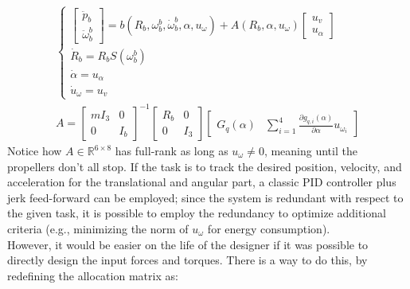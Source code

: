 \begin{gather*}
    \begin{cases}
        \begin{bmatrix}
            \ddot{p}_b \\ \ddot{\omega}_b^b
        \end{bmatrix}=b\left(R_b,\omega_b^b,\dot{\omega}_b^b,\alpha,u_\omega \right)+A\left(R_b,\alpha,u_\omega\right)
        \begin{bmatrix}
            u_v\\ u_\alpha
        \end{bmatrix}\\
        \dot{R}_b=R_bS\left(\omega_b^b\right)\\
        \dot{\alpha}=u_\alpha\\
        \dot{u}_\omega=u_v
    \end{cases}\\
    A=
    \begin{bmatrix}
        mI_3 & 0 \\ 0 & I_b
    \end{bmatrix}^{-1}
    \begin{bmatrix}
        R_b & 0 \\ 0 & I_3
    \end{bmatrix}
    \begin{bmatrix}
        G_q(\alpha) & \sum_{i=1}^{4}\frac{\partial g_{q,i}(\alpha)}{\partial\alpha}u_{\omega_i}
    \end{bmatrix}
\end{gather*}
Notice how $A\in\mathbb{R}^{6 \times 8}$ has full-rank as long as $u_\omega\neq0$, meaning until the propellers don't all stop. If the task is to track the desired position, velocity, and acceleration for the translational and angular part, a classic PID controller plus jerk feed-forward can be employed; since the system is redundant with respect to the given task, it is possible to employ the redundancy to optimize additional criteria (e.g., minimizing the norm of $u_\omega$ for energy consumption).\\
However, it would be easier on the life of the designer if it was possible to directly design the input forces and torques. There is a way to do this, by redefining the allocation matrix as:
